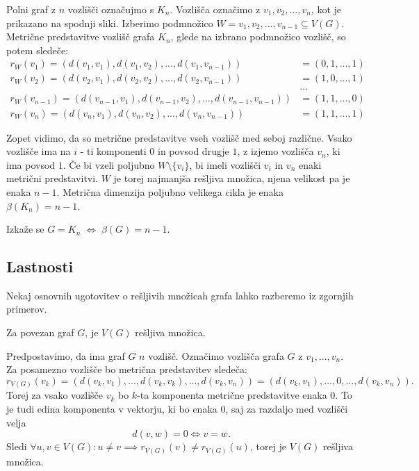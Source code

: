 \documentclass[mat1, tisk]{fmfdelo}
\begin{document}
\begin{primer}\label{primer_2.6.}
    Polni graf z $n$ vozlišči označujmo s $K_n$. 
    Vozlišča označimo z $v_1, v_2, ..., v_n$, 
    kot je prikazano na spodnji sliki. Izberimo podmnožico 
    $W = {v_1, v_2, ... , v_{n-1}} \subseteq V(G).$ 
    Metrične predstavitve vozlišč grafa $K_n$, glede na izbrano podmnožico vozlišč, so potem sledeče:
    \begin{align*}
        r_W(v_1) = (d(v_1, v_1), d(v_1, v_2), ... , d(v_1, v_{n-1})) & = (0, 1, ... , 1) \\
        r_W(v_2) = (d(v_2, v_1), d(v_2, v_2), ... , d(v_2, v_{n-1})) & = (1, 0, ... , 1) \\
        & \dots \\
        r_W(v_{n-1}) = (d(v_{n-1}, v_1), d(v_{n-1}, v_2), ... , d(v_{n-1}, v_{n-1})) & = (1, 1, ... , 0) \\
        r_W(v_n) = (d(v_n, v_1), d(v_n, v_2), ... ,  d(v_n, v_{n-1})) & = (1, 1, ... , 1)
    \end{align*}
    
    Zopet vidimo, da so metrične predstavitve vseh vozlišč med seboj različne. Vsako vozlišče ima na $i$ - ti
    komponenti $0$ in povsod drugje $1$, z izjemo vozlišča $v_n$, ki ima povsod $1$. 
    Če bi vzeli poljubno $W \setminus \{v_i\}$, 
    bi imeli vozlišči $v_i$ in $v_n$ enaki metrični predstavitvi.
    $W$  je torej najmanjša rešljiva množica, njena velikost pa je enaka $n-1$. Metrična dimenzija
    poljubno velikega cikla je enaka $\beta(K_n) = n-1.$
\end{primer}

\begin{opomba}
    Izkaže se $G = K_n \; \Leftrightarrow \; \beta(G) = n - 1.$
\end{opomba}

\subsection{Lastnosti}

Nekaj osnovnih ugotovitev o rešljivih množicah grafa lahko razberemo iz zgornjih primerov.

\begin{trditev}
Za povezan graf $G$, je $V(G)$ rešljiva množica.
\end{trditev}
\begin{dokaz}
Predpostavimo, da ima graf $G$ $n$ vozlišč. Označimo vozlišča grafa $G$ z $v_1, ..., v_n$.
Za posamezno vozlišče bo metrična predstavitev sledeča:
$$r_{V(G)}(v_k) = (d(v_k, v_1), ..., d(v_k, v_k), ... , d(v_k, v_n)) = (d(v_k, v_1), ..., 0 , ... , d(v_k, v_n)).$$
Torej za vsako vozlišče $v_k$ bo $k$-ta komponenta metrične predstavitve enaka $0$. To je tudi edina komponenta v vektorju, 
ki bo enaka $0$, saj za razdaljo med vozlišči velja
$$d(v, w) = 0 \Leftrightarrow v = w.$$
Sledi $\forall u, v \in V(G): u \neq v \implies r_{V(G)}(v) \neq r_{V(G)}(u)$, torej je $V(G)$ rešljiva množica.
\end{dokaz}
\end{document}
